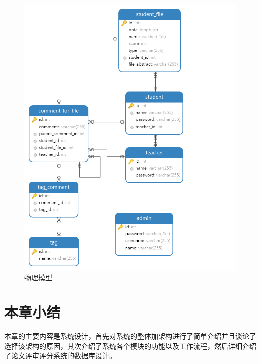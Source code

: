 \begin{figure}[ht]
    \centering
    \includegraphics[scale = 0.6]{out/uml/数据库/physical-model.png}
    \caption{\song\wuhao 物理模型}
    \label{physical-model}
\end{figure}

\section{本章小结}

本章的主要内容是系统设计，首先对系统的整体加架构进行了简单介绍并且谈论了选择该架构的原因，其次介绍了系统各个模块的功能以及工作流程，然后详细介绍了论文评审评分系统的数据库设计。